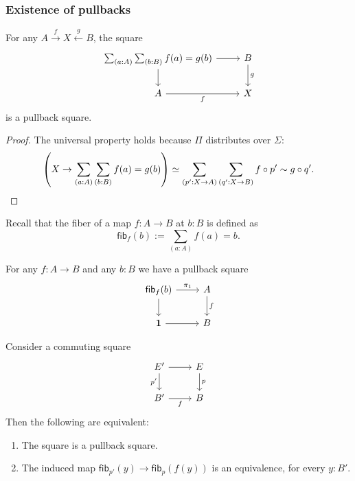 \documentclass[handout]{beamer}
\newcommand{\unit}{\mathbf{1}}
\newcommand{\fib}{\mathsf{fib}}
\begin{document}
\begin{frame}
  \frametitle{Existence of pullbacks}
  \begin{theorem}
    For any $A\stackrel{f}{\to} X \stackrel{g}{\leftarrow} B$, the square
    \begin{equation*}
      \begin{tikzcd}[ampersand replacement=\&]
        \sum_{(a:A)}\sum_{(b:B)}f(a)=g(b) \arrow[d] \arrow[r] \& B \arrow[d,"g"] \\
        A \arrow[r,swap,"f"] \& X
      \end{tikzcd}
    \end{equation*}
    is a pullback square.
  \end{theorem}

  \begin{proof}
    The universal property holds because $\Pi$ distributes over $\Sigma$:
    \begin{equation*}
      \left(X\to \sum_{(a:A)}\sum_{(b:B)}f(a)=g(b)\right)\simeq\sum_{(p':X\to A)}\sum_{(q':X\to B)}f\circ p'\sim g\circ q'.\qedhere
    \end{equation*}
  \end{proof}
\end{frame}

\begin{frame}
  Recall that the fiber of a map $f:A\to B$ at $b:B$ is defined as
  \begin{equation*}
    \fib_f(b):=\sum_{(a:A)}f(a)=b.
  \end{equation*}

  \begin{corollary}
    For any $f:A\to B$ and any $b:B$ we have a pullback square
    \begin{equation*}
      \begin{tikzcd}[ampersand replacement=\&]
        \fib_f(b) \arrow[d] \arrow[r,"\pi_1"] \& A \arrow[d,"f"] \\
        \unit \arrow[r] \& B
      \end{tikzcd}
    \end{equation*}
  \end{corollary}
\end{frame}

\begin{frame}
  \begin{theorem}
    Consider a commuting square
    \begin{equation*}
      \begin{tikzcd}[ampersand replacement=\&]
        E' \arrow[d,swap,"{p'}"] \arrow[r] \& E \arrow[d,"p"] \\
        B' \arrow[r,swap,"f"] \& B
      \end{tikzcd}
    \end{equation*}
    Then the following are equivalent:
    \begin{enumerate}
    \item The square is a pullback square.
    \item The induced map $\fib_{p'}(y)\to \fib_p(f(y))$ is an equivalence, for every $y:B'$.
    \end{enumerate}
  \end{theorem}
\end{frame}
\end{document}
